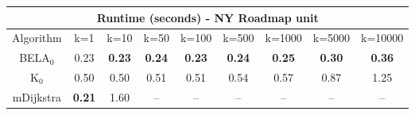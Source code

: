 \begin{tabular}{c|cccccccc}\toprule
\multicolumn{9}{c}{Runtime (seconds) - NY Roadmap unit}\\ \midrule
Algorithm & k=1 & k=10 & k=50 & k=100 & k=500 & k=1000 & k=5000 & k=10000 \\ \midrule
BELA$_0$ & 0.23 & \textbf{0.23} & \textbf{0.24} & \textbf{0.23} & \textbf{0.24} & \textbf{0.25} & \textbf{0.30} & \textbf{0.36} \\
K$_0$ & 0.50 & 0.50 & 0.51 & 0.51 & 0.54 & 0.57 & 0.87 & 1.25 \\
mDijkstra & \textbf{0.21} & 1.60 & -- & -- & -- & -- & -- & -- \\ \bottomrule 
\end{tabular}
